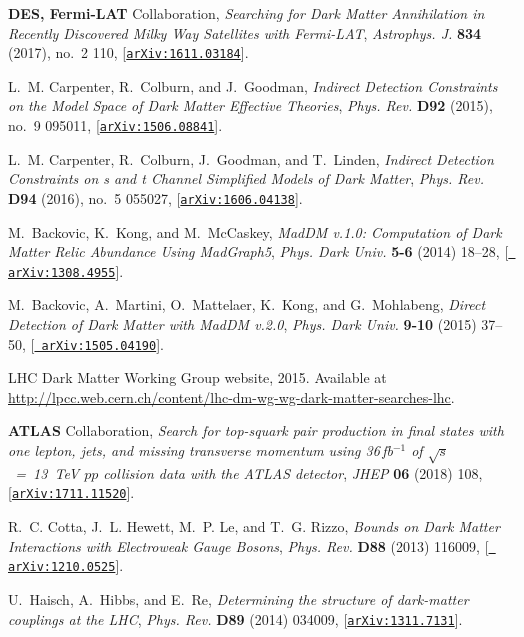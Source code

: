 \documentclass[review]{elsarticle}
\begin{document}
\begin{thebibliography}{100}
{\bf DES, Fermi-LAT} Collaboration, {\it {Searching for Dark
  Matter Annihilation in Recently Discovered Milky Way Satellites with
  Fermi-LAT}},  {\em Astrophys. J.} {\bf 834} (2017), no.~2 110,
  [\href{http://arxiv.org/abs/1611.03184}{{\tt arXiv:1611.03184}}].
  
L.~M. Carpenter, R.~Colburn, and J.~Goodman, {\it {Indirect Detection
  Constraints on the Model Space of Dark Matter Effective Theories}},  {\em
  Phys. Rev.} {\bf D92} (2015), no.~9 095011,
  [\href{http://arxiv.org/abs/1506.08841}{{\tt arXiv:1506.08841}}].

L.~M. Carpenter, R.~Colburn, J.~Goodman, and T.~Linden, {\it {Indirect
  Detection Constraints on s and t Channel Simplified Models of Dark Matter}},
  {\em Phys. Rev.} {\bf D94} (2016), no.~5 055027,
  [\href{http://arxiv.org/abs/1606.04138}{{\tt arXiv:1606.04138}}].

M.~Backovic, K.~Kong, and M.~McCaskey, {\it {MadDM v.1.0: Computation of Dark
  Matter Relic Abundance Using MadGraph5}},  {\em Phys. Dark Univ.} {\bf 5-6}
  (2014) 18--28, [\href{http://arxiv.org/abs/1308.4955}{{\tt
  arXiv:1308.4955}}].

M.~Backovic, A.~Martini, O.~Mattelaer, K.~Kong, and G.~Mohlabeng, {\it {Direct
  Detection of Dark Matter with MadDM v.2.0}},  {\em Phys. Dark Univ.} {\bf
  9-10} (2015) 37--50, [\href{http://arxiv.org/abs/1505.04190}{{\tt
  arXiv:1505.04190}}].

LHC Dark Matter Working Group website, 2015.
\newblock Available at
  \url{http://lpcc.web.cern.ch/content/lhc-dm-wg-wg-dark-matter-searches-lhc}.

{\bf ATLAS} Collaboration, {\it {Search for top-squark pair
  production in final states with one lepton, jets, and missing transverse
  momentum using 36$\,$fb$^{-1}$ of $ \sqrt{s}$~=~13~TeV $pp$ collision data with the
  ATLAS detector}},  {\em JHEP} {\bf 06} (2018) 108,
  [\href{http://arxiv.org/abs/1711.11520}{{\tt arXiv:1711.11520}}].

R.~C. Cotta, J.~L. Hewett, M.~P. Le, and T.~G. Rizzo, {\it {Bounds on Dark
  Matter Interactions with Electroweak Gauge Bosons}},  {\em Phys. Rev.} {\bf
  D88} (2013) 116009, [\href{http://arxiv.org/abs/1210.0525}{{\tt
  arXiv:1210.0525}}].

U.~Haisch, A.~Hibbs, and E.~Re, {\it {Determining the structure of dark-matter
  couplings at the LHC}},  {\em Phys. Rev.} {\bf D89} (2014) 034009,
  [\href{http://arxiv.org/abs/1311.7131}{{\tt arXiv:1311.7131}}].


\end{thebibliography}
\end{document}

